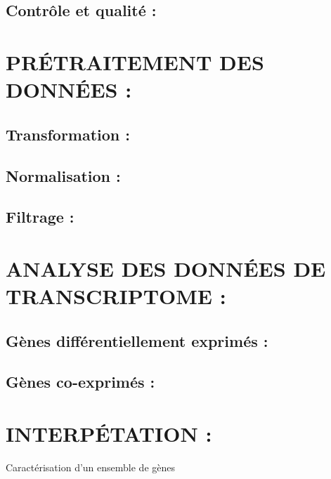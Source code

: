\documentclass[a4paper,10pt]{article}
\begin{document}
\subsection{ Contrôle et qualité :}

\section{PR\'{E}TRAITEMENT DES DONN\'{E}ES :}
\subsection{Transformation :}
\subsection{Normalisation :}
\subsection{Filtrage :}

\section{ANALYSE DES DONN\'{E}ES DE TRANSCRIPTOME :}
\subsection{Gènes différentiellement exprimés :}
\subsection{Gènes co-exprimés :}

\section{INTERP\'{E}TATION :}
Caractérisation d’un ensemble de gènes
\begin{abstract}
\end{abstract}
\end{document}
